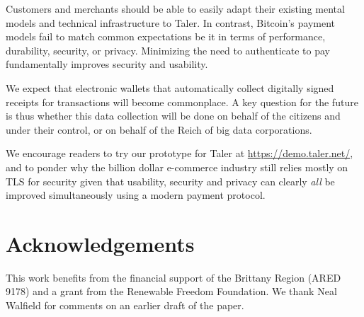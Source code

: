 \documentclass{llncs}
\begin{document}
Customers and merchants should be able to easily adapt their existing
mental models and technical infrastructure to Taler.  In contrast,
Bitcoin's payment models fail to match common expectations be it in
terms of performance, durability, security, or privacy.  Minimizing
the need to authenticate to pay fundamentally improves security
and usability.

We expect that electronic wallets that automatically collect digitally
signed receipts for transactions will become commonplace.  A key
question for the future is thus whether this data collection will be
done on behalf of the citizens and under their control, or on behalf
of the Reich of big data corporations.

We encourage readers to try our prototype for Taler
at \url{https://demo.taler.net/}, and to ponder why the billion dollar
e-commerce industry still relies mostly on TLS for security given
that usability, security and privacy can clearly {\em all} be improved
simultaneously using a modern payment protocol.


\section*{Acknowledgements}

This work benefits from the financial support of the Brittany Region
(ARED 9178) and a grant from the Renewable Freedom Foundation.  We
thank Neal Walfield for comments on an earlier draft of the paper.



\end{document}
